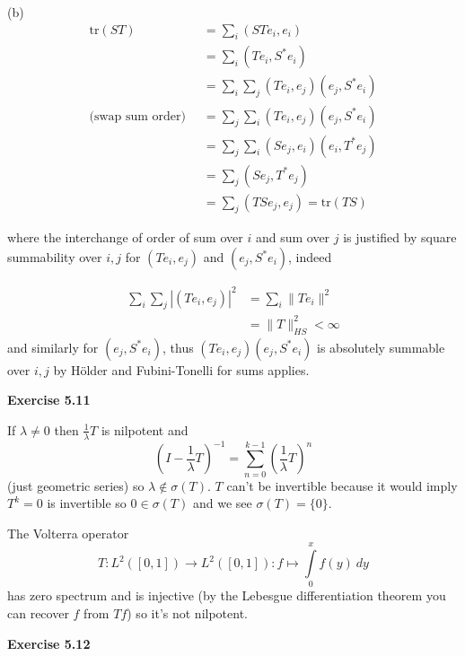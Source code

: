 \documentclass{article}
\begin{document}
(b)
\begin{align*}
    \text{tr}(ST) & = \sum\limits_i (STe_i, e_i)\\
    &= \sum\limits_i (Te_i, S^* e_i)\\
    & = \sum\limits_i \sum\limits_j (Te_i, e_j) (e_j, S^*e_i) \\
    (\text{swap sum order) } \ & = \sum\limits_j \sum\limits_i (Te_i, e_j) (e_j, S^*e_i) \\
    & = \sum\limits_j \sum\limits_i (S e_j, e_i)(e_i, T^*e_j)  \\
    & = \sum\limits_j (Se_j, T^*e_j)\\
    & = \sum\limits_j (TSe_j, e_j) = \text{tr}(TS)
\end{align*}

where the interchange of order of sum over $i$ and sum over $j$ is justified by square summability over $i,j$ for $(Te_i,e_j)$ and $(e_j,S^*e_i)$, indeed 

\begin{align*}
    \sum\limits_i \sum\limits_j |(Te_i, e_j)|^2 &= \sum\limits_i \|Te_i\|^2 \\
    & = \|T\|^2_{HS} < \infty
\end{align*}
and similarly for $(e_j,S^*e_i)$, thus $(Te_i, e_j) (e_j, S^*e_i)$ is absolutely summable over $i,j$ by Hölder and Fubini-Tonelli for sums applies.





\vspace{0.5cm}


\textbf{Exercise 5.11}

\vspace{0.5cm}

If $\lambda \neq 0$ then $\frac{1}{\lambda}T$ is nilpotent and 
$$(I-\frac{1}{\lambda} T)^{-1} = \sum\limits_{n = 0}^{k-1}(\frac{1}{\lambda}T)^n$$ 
(just geometric series) so $\lambda \not \in \sigma(T)$. $T$ can't be invertible because it would imply $T^k = 0$ is invertible so $0 \in \sigma(T)$ and we see $\sigma(T) = \{0\}$.

The Volterra operator 
$$T:L^2([0,1]) \rightarrow L^2([0,1]) : f \mapsto \int\limits_0^x f(y) \ dy $$
has zero spectrum and is injective (by the Lebesgue differentiation theorem you can recover $f$ from $Tf$) so it's not nilpotent.

\vspace{0.5cm}

\textbf{Exercise 5.12}

\vspace{0.5cm}
\end{document}
